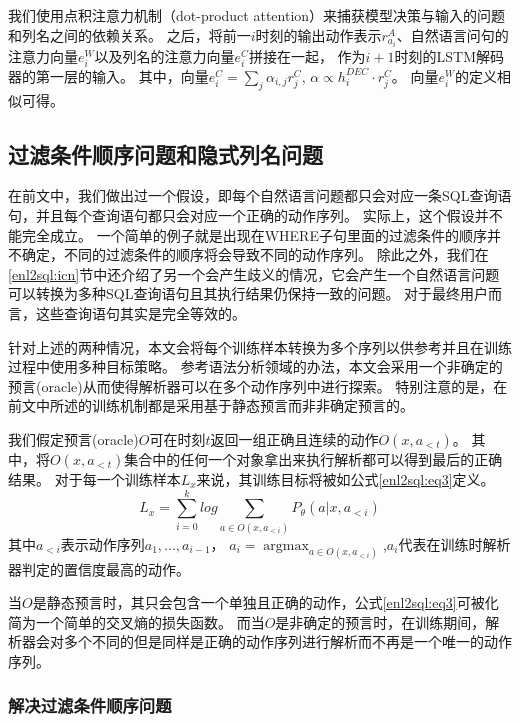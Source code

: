 我们使用点积注意力机制（dot-product attention）\cite{vaswani2017attention}来捕获模型决策与输入的问题和列名之间的依赖关系。
之后，将前一$i$时刻的输出动作表示$r^A_{a_i}$、自然语言问句的注意力向量$e^W_i$以及列名的注意力向量$e^C_i$拼接在一起，
作为$i+1$时刻的LSTM解码器的第一层的输入。
其中，向量$e^C_i = \sum_j \alpha_{i,j} r^C_j$,  $\alpha \propto h^{DEC}_i \cdot r^C_j$。
向量$e^W_i$的定义相似可得。



\subsection{过滤条件顺序问题和隐式列名问题}
\label{enl2sql:ndo}

在前文中，我们做出过一个假设，即每个自然语言问题都只会对应一条SQL查询语句，并且每个查询语句都只会对应一个正确的动作序列。
实际上，这个假设并不能完全成立。
一个简单的例子就是出现在WHERE子句里面的过滤条件的顺序并不确定，不同的过滤条件的顺序将会导致不同的动作序列。
除此之外，我们在\ref{enl2sql:icn}节中还介绍了另一个会产生歧义的情况，它会产生一个自然语言问题可以转换为多种SQL查询语句且其执行结果仍保持一致的问题。
对于最终用户而言，这些查询语句其实是完全等效的。

针对上述的两种情况，本文会将每个训练样本转换为多个序列以供参考并且在训练过程中使用多种目标策略。
参考语法分析领域的办法，本文会采用一个非确定的预言(oracle)从而使得解析器可以在多个动作序列中进行探索。
特别注意的是，在前文中所述的训练机制都是采用基于静态预言而非非确定预言的。

我们假定预言(oracle)$O$可在时刻$t$返回一组正确且连续的动作$O(x,a_{<t})$。
其中，将$O(x,a_{<t})$集合中的任何一个对象拿出来执行解析都可以得到最后的正确结果。
对于每一个训练样本$L_x$来说，其训练目标将被如公式\ref{enl2sql:eq3}定义。
\begin{equation}
  \label{enl2sql:eq3}
  L_x = \sum_{i=0}^k log \sum_{a\in O(x,a_{<i})} P_{\theta}(a|x,a_{<i})
\end{equation}
其中$a_{<i}$表示动作序列$a_{1},...,a_{i-1}$，
$a_{i} = \mathop{\arg\max}_{a\in O(x,a_{<i})}$,$a_i$代表在训练时解析器判定的置信度最高的动作。

当$O$是静态预言时，其只会包含一个单独且正确的动作，公式\ref{enl2sql:eq3}可被化简为一个简单的交叉熵的损失函数。
而当$O$是非确定的预言时，在训练期间，解析器会对多个不同的但是同样是正确的动作序列进行解析而不再是一个唯一的动作序列。

\subsubsection{解决过滤条件顺序问题}
\label{enl2sql:om}

